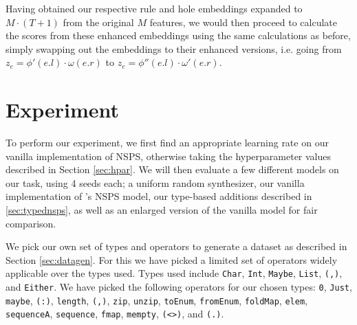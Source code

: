 \documentclass{article} %
\begin{document}
Having obtained our respective rule and hole embeddings expanded to $M \cdot (T+1)$ from the original $M$ features,
we would then proceed to calculate the scores from these enhanced embeddings using the same calculations as before,
simply swapping out the embeddings to their enhanced versions,
i.e. going from $z_e = \phi'(e.l) \cdot \omega(e.r)$ to $z_e = \phi''(e.l) \cdot \omega'(e.r)$.



\vspace{-10pt}
\section{Experiment} \label{sec:experiment}
\vspace{-10pt}

To perform our experiment, we first find an appropriate learning rate on our vanilla implementation of NSPS,
otherwise taking the hyperparameter values described in Section \ref{sec:hpar}.
% 
We will then evaluate a few different models on our task, using 4 seeds each;
a uniform random synthesizer,
our vanilla implementation of \citet{nsps}'s NSPS model,
our type-based additions described in \ref{sec:typednsps},
as well as an enlarged version of the vanilla model for fair comparison.


We pick our own set of types and operators to generate a dataset as described in Section \ref{sec:datagen}.
For this we have picked a limited set of operators widely applicable over the types used.
Types used include \verb|Char|, \verb|Int|, \verb|Maybe|, \verb|List|, \verb|(,)|, and \verb|Either|.
%
We have picked the following operators for our chosen types:
\verb|0|, %
\verb|Just|, %
\verb|maybe|, %
\verb|(:)|, %
\verb|length|, %
\verb|(,)|, %
\verb|zip|, %
\verb|unzip|, %
\verb|toEnum|, %
\verb|fromEnum|, %
\verb|foldMap|, %
\verb|elem|, %
\verb|sequenceA|, %
\verb|sequence|, %
\verb|fmap|, %
\verb|mempty|, %
\verb|(<>)|, %
%
and \verb|(.)|.
\end{document}
